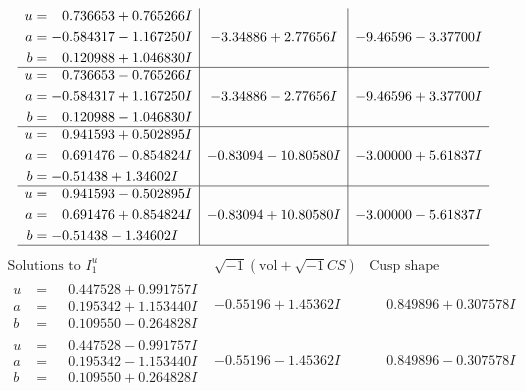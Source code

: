 \documentclass[1p]{elsarticle_modified}
\theoremstyle{definition}
\newcommand{\I}{\sqrt{-1}}
\begin{document}
$$\begin{array}{c|c|c}
\begin{aligned}
u &= \phantom{-}0.736653 + 0.765266 I \\
a &= -0.584317 - 1.167250 I \\
b &= \phantom{-}0.120988 + 1.046830 I\end{aligned}
 & -3.34886 + 2.77656 I & -9.46596 - 3.37700 I \\ \hline\begin{aligned}
u &= \phantom{-}0.736653 - 0.765266 I \\
a &= -0.584317 + 1.167250 I \\
b &= \phantom{-}0.120988 - 1.046830 I\end{aligned}
 & -3.34886 - 2.77656 I & -9.46596 + 3.37700 I \\ \hline\begin{aligned}
u &= \phantom{-}0.941593 + 0.502895 I \\
a &= \phantom{-}0.691476 - 0.854824 I \\
b &= -0.51438 + 1.34602 I\end{aligned}
 & -0.83094 - 10.80580 I & -3.00000 + 5.61837 I \\ \hline\begin{aligned}
u &= \phantom{-}0.941593 - 0.502895 I \\
a &= \phantom{-}0.691476 + 0.854824 I \\
b &= -0.51438 - 1.34602 I\end{aligned}
 & -0.83094 + 10.80580 I & -3.00000 - 5.61837 I\\
 \hline 
 \end{array}$$\newpage$$\begin{array}{c|c|c}  
\text{Solutions to }I^u_{1}& \I (\text{vol} + \sqrt{-1}CS) & \text{Cusp shape}\\
 \hline 
\begin{aligned}
u &= \phantom{-}0.447528 + 0.991757 I \\
a &= \phantom{-}0.195342 + 1.153440 I \\
b &= \phantom{-}0.109550 - 0.264828 I\end{aligned}
 & -0.55196 + 1.45362 I & \phantom{-}0.849896 + 0.307578 I \\ \hline\begin{aligned}
u &= \phantom{-}0.447528 - 0.991757 I \\
a &= \phantom{-}0.195342 - 1.153440 I \\
b &= \phantom{-}0.109550 + 0.264828 I\end{aligned}
 & -0.55196 - 1.45362 I & \phantom{-}0.849896 - 0.307578 I \\ \hline\begin{aligned}

\end{aligned}
\end{array}$$
\end{document}

